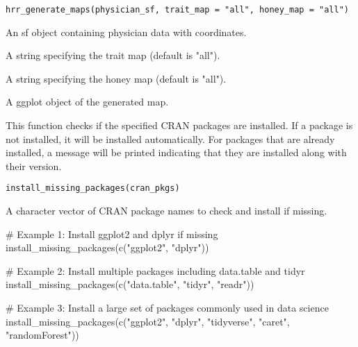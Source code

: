 \documentclass[a4paper]{book}
\begin{document}
%
\begin{Usage}
\begin{verbatim}
hrr_generate_maps(physician_sf, trait_map = "all", honey_map = "all")
\end{verbatim}
\end{Usage}
%
\begin{Arguments}
\begin{ldescription}
\item[\code{physician\_sf}] An sf object containing physician data with coordinates.

\item[\code{trait\_map}] A string specifying the trait map (default is "all").

\item[\code{honey\_map}] A string specifying the honey map (default is "all").
\end{ldescription}
\end{Arguments}
%
\begin{Value}
A ggplot object of the generated map.
\end{Value}
%
\begin{Description}
This function checks if the specified CRAN packages are installed. If a package is not installed, it will be installed automatically. For packages that are already installed, a message will be printed indicating that they are installed along with their version.
\end{Description}
%
\begin{Usage}
\begin{verbatim}
install_missing_packages(cran_pkgs)
\end{verbatim}
\end{Usage}
%
\begin{Arguments}
\begin{ldescription}
\item[\code{cran\_pkgs}] A character vector of CRAN package names to check and install if missing.
\end{ldescription}
\end{Arguments}
%
\begin{Examples}
\begin{ExampleCode}
# Example 1: Install ggplot2 and dplyr if missing
install_missing_packages(c("ggplot2", "dplyr"))

# Example 2: Install multiple packages including data.table and tidyr
install_missing_packages(c("data.table", "tidyr", "readr"))

# Example 3: Install a large set of packages commonly used in data science
install_missing_packages(c("ggplot2", "dplyr", "tidyverse", "caret", "randomForest"))

\end{ExampleCode}
\end{Examples}
\end{document}
